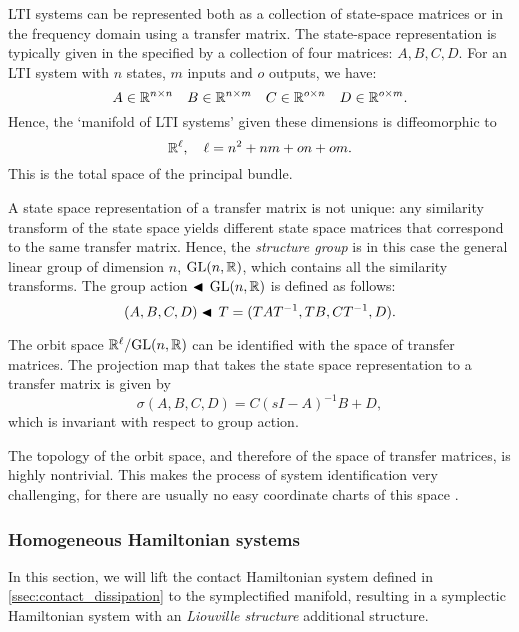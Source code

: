 LTI systems can be represented both as a collection of state-space matrices or in the frequency domain using a transfer matrix. The state-space representation is typically given in the specified by a collection of four matrices: \(A, B, C, D\). For an LTI system with \(n\) states, \(m\) inputs and \(o\) outputs, we have:
\begin{equation}
     A \in \mathbb{R}^{n \times n} \quad B \in \mathbb{R}^{n \times m} \quad C \in \mathbb{R}^{o \times n} \quad D \in \mathbb{R}^{o \times m}.
\end{equation}
Hence, the `manifold of LTI systems' given these dimensions is diffeomorphic to \cite{Verhaegen2007} \begin{equation}
     \mathbb{R}^{\ell}, \quad \ell = n^2 + nm + on + om.
\end{equation}  
This is the total space of the principal bundle.

A state space representation of a transfer matrix is not unique: any similarity transform of the state space yields different state space matrices that correspond to the same transfer matrix. Hence, the \emph{structure group} is in this case the general linear group of dimension \(n\), \(\mathrm{GL}(n, \mathbb{R})\), which contains all the similarity transforms. The group action \(\blacktriangleleft\,\mathrm{GL}(n, \mathbb{R}) \) is defined as follows:
\begin{equation}
     (A, B, C, D) \blacktriangleleft\,T = (T A T^{-1}, TB, CT^{-1}, D).
\end{equation}

The orbit space \(\mathbb{R}^\ell/\mathrm{GL}(n, \mathbb{R})\) can be identified with the space of transfer matrices. The projection map that takes the state space representation to a transfer matrix is given by
\begin{equation}
     \sigma(A, B, C, D) = C(s I - A )^{-1} B + D,
\end{equation}
which is invariant with respect to group action.

The topology of the orbit space, and therefore of the space of transfer matrices, is highly nontrivial. This makes the process of system identification very challenging, for there are usually no easy coordinate charts of this space \cite{Verhaegen2007,Hermann1984}.

\subsubsection{Homogeneous Hamiltonian systems}
In this section, we will lift the contact Hamiltonian system defined in \cref{ssec:contact_dissipation} to the symplectified manifold, resulting in a symplectic Hamiltonian system with an \emph{Liouville structure} additional structure.

